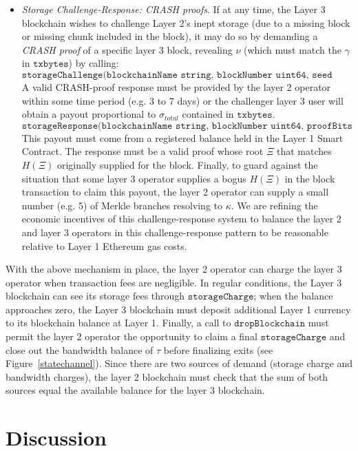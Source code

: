 \documentclass{article}
\newcommand{\keyroot}{\kappa}
\newcommand{\hash}[1]{H(#1)}
\newcommand{\seedhash}{\gamma}
\newcommand{\seed}{\nu}
\begin{document}
\begin{itemize}
    \item {\em Storage Challenge-Response: CRASH proofs}. If at any time, the Layer 3 blockchain wishes to challenge Layer 2's inept storage (due to a missing block or missing chunk included in the block), it may do so by demanding a {\em CRASH proof} of a specific layer 3 block, revealing $\seed$ (which must match the $\seedhash$ in $\texttt{txbytes}$) by calling:
    \[
    \texttt{storageChallenge(blockchainName string, blockNumber uint64, seed bytes32)}
    \]
    A valid CRASH-proof response must be provided by the layer 2 operator within some time period (e.g. 3 to 7 days) or the challenger layer 3 user will obtain a payout proportional to $\sigma_{total}$ contained in $\texttt{txbytes}$.
    \[
    \texttt{storageResponse(blockchainName string, blockNumber uint64, proofBits uint64, proofBytes bytes)}
    \]
    This payout must come from a registered balance held in the Layer 1 Smart Contract.  The response must be a valid proof whose root $\Xi$ that matches $\hash{\Xi}$ originally supplied for the block.   Finally, to guard against the situation that some layer 3 operator supplies a bogus $\hash{\Xi}$ in the block transaction to claim this payout, the layer 2 operator can supply a small number (e.g. 5) of Merkle branches resolving to $\keyroot$.  We are refining the economic incentives of this challenge-response system to balance the layer 2 and layer 3 operators in this challenge-response pattern to be reasonable relative to Layer 1 Ethereum gas costs.
\end{itemize}
With the above mechanism in place, the layer 2 operator can charge the layer 3 operator when transaction fees are negligible.  In regular conditions, the Layer 3 blockchain  can see its storage fees through $\texttt{storageCharge}$; when the balance approaches zero, the Layer 3 blockchain must deposit additional Layer 1 currency to its blockchain balance at Layer 1.  Finally, a call to $\texttt{dropBlockchain}$ must permit the layer 2 operator the opportunity to claim a final $\texttt{storageCharge}$ and close out the bandwidth balance of $\tau$ before  finalizing exits (see Figure~\ref{statechannel}).  Since there are two sources of demand (storage charge and bandwidth charges), the layer 2 blockchain must check that the sum of both sources equal the available balance for the layer 3 blockchain.

\section{Discussion}
\end{document}
